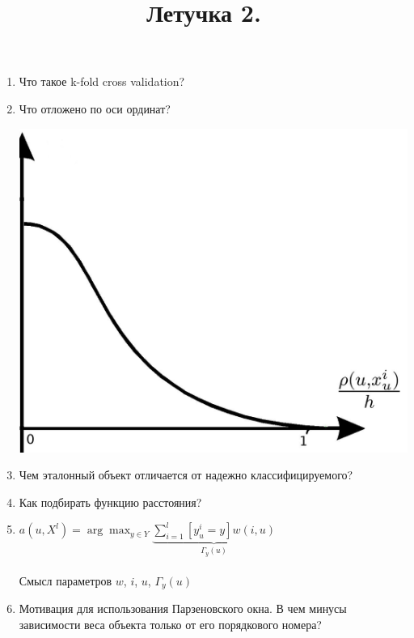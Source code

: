 \documentclass[12pt] {article}
\title{Летучка 2.}
\begin{document}
\clearpage
\thispagestyle{empty}
\begin{enumerate}
\item Что такое k-fold cross validation? 
\vspace{10mm}

\item 
\begin{minipage}[t]{0.65\linewidth}
      Что отложено по оси ординат? 
   \end{minipage}%
   \hfill
   \begin{minipage}[t]{0.35\linewidth}
     \vspace{-9.5ex}
	\includegraphics[width=.9\textwidth]{images/parzen}
   \end{minipage}

\vspace{10mm}
\item Чем эталонный объект отличается от надежно классифицируемого?   

\vspace{10mm}
\item \begin{minipage}[t]{0.65\linewidth}
      Как подбирать функцию расстояния? 
   \end{minipage}%
\vspace{10mm}

\item ${a(u, X^l) = \arg\max_{y \in Y} \underbrace{\sum\limits_{i=1}^l [y_u^i = y]w(i, u)}_{\Gamma_y(u)} }$\\
\\ Смысл параметров $w$, $i$, $u$, $\Gamma_y(u)$
\vspace{10mm}
\item Мотивация для использования Парзеновского окна. В чем минусы зависимости веса объекта только от его порядкового номера?


\end{enumerate}
\end{document}
